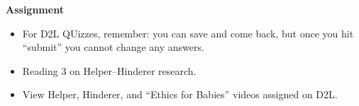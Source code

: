 {\bf Assignment}
 \begin{itemize}
 \item %
   For D2L QUizzes, remember: you can save and come
   back, but once you hit ``submit'' you cannot change any answers.
 \item Reading 3 on Helper--Hinderer research. 
 \item View Helper, Hinderer, and ``Ethics for Babies'' videos
   assigned on D2L.
 \end{itemize}


